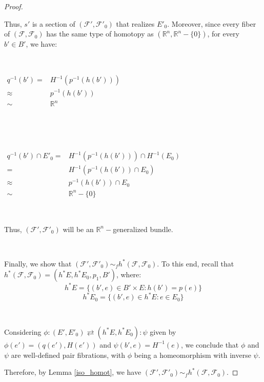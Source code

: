 \documentclass[12pt,oneside]{book}
\begin{document}
\begin{proof}
        \
            
        Thus, $s'$ is a section of $(\mathcal{F'}, \mathcal{F'}_{0})$ that realizes $E'_{0}$. Moreover, since every fiber of 
        $(\mathcal{F}, \mathcal{F}_{0})$ has the same type of homotopy as $(\mathbb{R}^n, \mathbb{R}^n - \{ 0 \})$, for every 
        $b' \in B'$, we have:

        \
            
            
            $\begin{array}{rl}
                q^{-1}(b') = & H^{-1}(p^{-1}(h(b'))) \\
                \approx & p^{-1}(h(b')) \\
                \sim & \mathbb{R}^n
            \end{array}$
        
        \

        \
            
            $\begin{array}{rl}
                q^{-1}(b') \cap E'_{0} = & H^{-1}(p^{-1}(h(b'))) \cap H^{-1}(E_{0}) \\
                = & H^{-1}(p^{-1}(h(b')) \cap E_{0}) \\
                \approx & p^{-1}(h(b')) \cap E_{0} \\
                \sim & \mathbb{R}^n - \{ 0 \}
            \end{array}$
        
        \
            
        Thus, $(\mathcal{F'}, \mathcal{F'}_{0})$ will be an $\mathbb{R}^n-$generalized bundle.

        \
            
        Finally, we show that $(\mathcal{F'}, \mathcal{F'}_{0}) \sim_{f} h^{*}(\mathcal{F}, \mathcal{F}_{0})$. To this end, recall that 
        $h^{*}(\mathcal{F}, \mathcal{F}_{0}) = (h^{*}E, h^{*}E_{0}, p_{1}, B')$, where:
            $$h^{*}E = \{ (b', e) \in B' \times E : h(b') = p(e) \}$$
            $$h^{*}E_{0} = \{ (b', e) \in h^{*}E : e \in E_{0} \}$$
            
        \

        Considering $\phi: (E', E'_{0}) \rightleftarrows (h^{*}E, h^{*}E_{0}): \psi$ given by $\phi(e') = (q(e'), H(e'))$ and 
        $\psi(b', e) = H^{-1}(e)$, we conclude that $\phi$ and $\psi$ are well-defined pair fibrations, with $\phi$ being a homeomorphism 
        with inverse $\psi$.
            
        Therefore, by Lemma \ref{iso_homot}, we have $(\mathcal{F'}, \mathcal{F'}_{0}) \sim_{f} h^{*}(\mathcal{F}, \mathcal{F}_{0})$.
            
    \end{proof}
\end{document}
